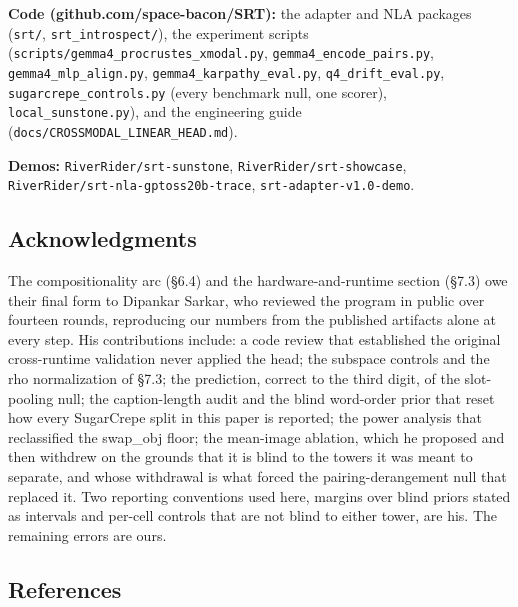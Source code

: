 \documentclass[
  11pt,
]{article}
\begin{document}
\textbf{Code (github.com/space-bacon/SRT):} the adapter and NLA packages
(\texttt{srt/}, \texttt{srt\_introspect/}), the experiment scripts
(\texttt{scripts/gemma4\_procrustes\_xmodal.py},
\texttt{gemma4\_encode\_pairs.py}, \texttt{gemma4\_mlp\_align.py},
\texttt{gemma4\_karpathy\_eval.py}, \texttt{q4\_drift\_eval.py},
\texttt{sugarcrepe\_controls.py} (every benchmark null, one scorer),
\texttt{local\_sunstone.py}), and the engineering guide
(\texttt{docs/CROSSMODAL\_LINEAR\_HEAD.md}).

\textbf{Demos:} \texttt{RiverRider/srt-sunstone},
\texttt{RiverRider/srt-showcase},
\texttt{RiverRider/srt-nla-gptoss20b-trace},
\texttt{srt-adapter-v1.0-demo}.

\subsection{Acknowledgments}\label{acknowledgments}

The compositionality arc (§6.4) and the hardware-and-runtime section
(§7.3) owe their final form to Dipankar Sarkar, who reviewed the program
in public over fourteen rounds, reproducing our numbers from the
published artifacts alone at every step. His contributions include: a
code review that established the original cross-runtime validation never
applied the head; the subspace controls and the rho normalization of
§7.3; the prediction, correct to the third digit, of the slot-pooling
null; the caption-length audit and the blind word-order prior that reset
how every SugarCrepe split in this paper is reported; the power analysis
that reclassified the swap\_obj floor; the mean-image ablation, which he
proposed and then withdrew on the grounds that it is blind to the towers
it was meant to separate, and whose withdrawal is what forced the
pairing-derangement null that replaced it. Two reporting conventions
used here, margins over blind priors stated as intervals and per-cell
controls that are not blind to either tower, are his. The remaining
errors are ours.

\subsection{References}\label{references}
\end{document}
